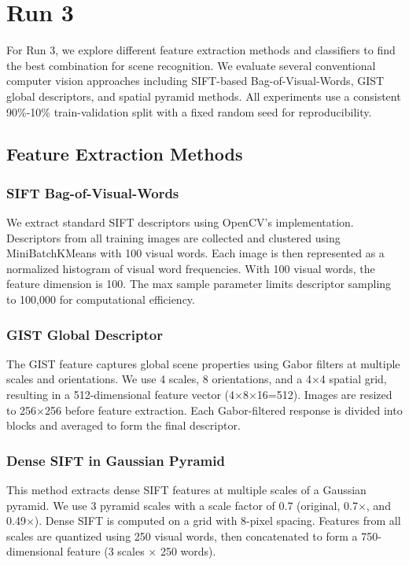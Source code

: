 \documentclass[10pt,twocolumn,letterpaper]{article}
\begin{document}
\section{Run 3}

For Run 3, we explore different feature extraction methods and classifiers to find the best combination for scene recognition. We evaluate several conventional computer vision approaches including SIFT-based Bag-of-Visual-Words, GIST global descriptors, and spatial pyramid methods. All experiments use a consistent 90\%-10\% train-validation split with a fixed random seed for reproducibility.

\subsection{Feature Extraction Methods}

\subsubsection{SIFT Bag-of-Visual-Words}
We extract standard SIFT descriptors using OpenCV's implementation. Descriptors from all training images are collected and clustered using MiniBatchKMeans with 100 visual words. Each image is then represented as a normalized histogram of visual word frequencies. With 100 visual words, the feature dimension is 100. The max sample parameter limits descriptor sampling to 100,000 for computational efficiency.

\subsubsection{GIST Global Descriptor}
The GIST feature captures global scene properties using Gabor filters at multiple scales and orientations. We use 4 scales, 8 orientations, and a 4$\times$4 spatial grid, resulting in a 512-dimensional feature vector (4$\times$8$\times$16=512). Images are resized to 256$\times$256 before feature extraction. Each Gabor-filtered response is divided into blocks and averaged to form the final descriptor.

\subsubsection{Dense SIFT in Gaussian Pyramid}
This method extracts dense SIFT features at multiple scales of a Gaussian pyramid. We use 3 pyramid scales with a scale factor of 0.7 (original, 0.7$\times$, and 0.49$\times$). Dense SIFT is computed on a grid with 8-pixel spacing. Features from all scales are quantized using 250 visual words, then concatenated to form a 750-dimensional feature (3 scales $\times$ 250 words).
\end{document}
